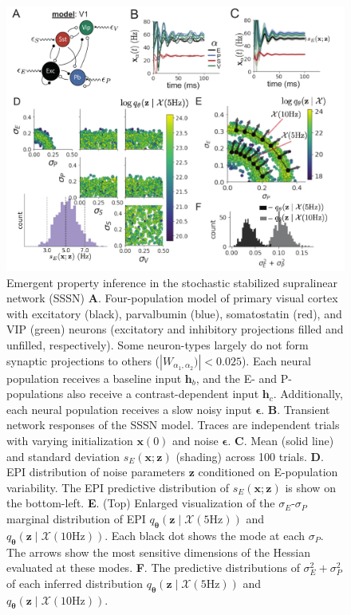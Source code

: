 \documentclass[11pt]{article}
\begin{document}
\begin{figure}
\vspace{-1cm}
\begin{center}
\includegraphics[scale=0.8]{figures/fig3/fig3.pdf}
\end{center}
\caption{Emergent property inference in the stochastic stabilized supralinear network (SSSN)
\textbf{A}.  Four-population model of primary visual cortex with excitatory (black), parvalbumin (blue), somatostatin (red), and VIP (green) neurons (excitatory and inhibitory projections filled and unfilled, respectively).   
Some neuron-types largely do not form synaptic projections to others ($|W_{\alpha_1, \alpha_2})| < 0.025$).
Each neural population receives a baseline input $\mathbf{h}_b$, and the E- and P-populations also receive a contrast-dependent input $\mathbf{h}_c$.
Additionally, each neural population receives a slow noisy input $\bm{\epsilon}$.
\textbf{B}. Transient network responses of the SSSN model. Traces are independent trials with varying initialization $\mathbf{x}(0)$ and noise $\bm{\epsilon}$. 
\textbf{C}. Mean (solid line) and standard deviation $s_E(\mathbf{x}; \mathbf{z})$ (shading)  across 100 trials.
\textbf{D}. EPI distribution of noise parameters $\mathbf{z}$ conditioned on E-population variability.
The EPI predictive distribution of $s_E(\mathbf{x}; \mathbf{z})$ is show on the bottom-left.
\textbf{E}. (Top) Enlarged visualization of the $\sigma_E$-$\sigma_P$ marginal distribution of EPI $q_{\bm{\theta}}(\mathbf{z} \mid \mathcal{X}(5\text{Hz}))$ and $q_{\bm{\theta}}(\mathbf{z} \mid \mathcal{X}(10\text{Hz}))$.
Each black dot shows the mode at each $\sigma_P$.
The arrows show the most sensitive dimensions of the Hessian evaluated at these modes.
\textbf{F}. The predictive distributions of $\sigma_E^2 + \sigma_P^2$ of each inferred distribution $q_{\bm{\theta}}(\mathbf{z} \mid \mathcal{X}(5\text{Hz}))$ and $q_{\bm{\theta}}(\mathbf{z} \mid \mathcal{X}(10\text{Hz}))$.
}
 \label{fig:V1}
\end{figure}
\end{document}
